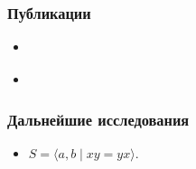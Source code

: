 \documentclass[11pt, notheorems]{beamer}
\begin{document}
\begin{frame}
	\frametitle{Публикации}

	\begin{itemize}
		\item \cite{flat_unars}
		\item \cite{pryan:unars_close_to_flat}
	\end{itemize}

\end{frame}

\begin{frame}
	\frametitle{Дальнейшие исследования}

	\begin{itemize}
		\item $S = \langle a, b \mid xy = yx \rangle$.
	\end{itemize}

\end{frame}
\end{document}
